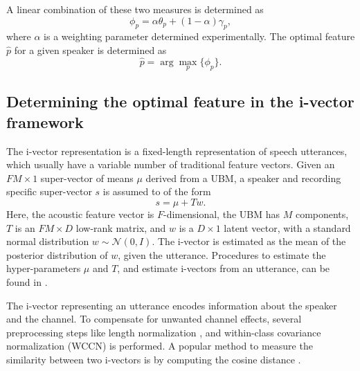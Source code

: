 \documentclass[preprint,12pt,5p]{elsarticle}
\begin{document}


A linear combination of these two measures is determined as
\begin{equation}
\phi_p = \alpha \theta_p  + (1-\alpha) \gamma_p,
\label{eq:phiFunc}
\end{equation}
where $\alpha$ is a weighting parameter determined experimentally. The optimal
feature $\hat{p}$ for a given speaker is determined as 
\begin{equation}
\hat{p} = \arg\max_p \{\phi_p\}.
\label{eq:ubm_optFeat}
\end{equation}

\subsection{Determining the optimal feature in the i-vector framework}
\label{subsec:ivec_optFeat}

The i-vector representation \cite{dehak_ivector} is a fixed-length
representation of speech utterances, which usually have a variable number of
traditional feature vectors.  Given an $FM \times 1$ super-vector of means $\mu$
derived from a UBM, a speaker and recording specific super-vector $s$ is assumed to of
the form
\begin{equation}
s = \mu + T w.
\end{equation}
Here, the acoustic feature vector is $F$-dimensional, the UBM has $M$ components,
$T$ is an $FM \times D$ low-rank matrix, and $w$ is a $D \times 1$ latent
vector, with a standard normal distribution $w \sim \mathcal{N}(0,I)$. The
i-vector is estimated as the mean of the posterior distribution of $w$, given
the utterance. Procedures to estimate the hyper-parameters $\mu$ and $T$, and 
estimate i-vectors from an utterance, can be found in \cite{dehak_ivector}.

The i-vector representing an utterance encodes information about 
the speaker and the channel. To compensate for unwanted channel effects,
several preprocessing steps like length normalization \cite{garcia_lengthNorm},
and within-class covariance normalization (WCCN) \cite{wccn} is performed. A
popular method to measure the similarity between two i-vectors is by computing the
cosine distance \cite{dehak_ivector}.
\end{document}

